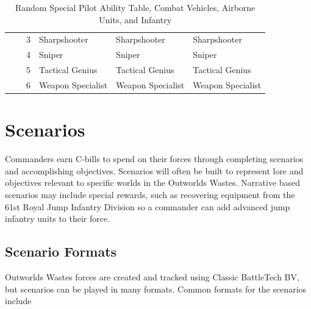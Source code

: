 \documentclass{article}
\begin{document}
\begin{itemize}
\begin{table}[!ht]
\begin{tabular}{| C{4em} | C{4em} | C{4em} | m{10em} | m{10em} | m{10em} |}
      &        & 3     & Sharpshooter      & Sharpshooter      & Sharpshooter      \\
      &        & 4     & Sniper            & Sniper            & Sniper            \\
      &        & 5     & Tactical Genius   & Tactical Genius   & Tactical Genius   \\
      &        & 6     & Weapon Specialist & Weapon Specialist & Weapon Specialist \\
\hline
\end{tabular}
\caption*{Random Special Pilot Ability Table, Combat Vehicles, Airborne Units, and Infantry}
\end{table}

\end{itemize}

\clearpage

\newpage

\section{Scenarios}

Commanders earn C-bills to spend on their forces through completing scenarios and accomplishing objectives.
Scenarios will often be built to represent lore and objectives relevant to specific worlds in the Outworlds Wastes.
Narrative based scenarios may include special rewards, such as recovering equipment from the 61st Royal Jump Infantry Division so a commander can add advanced jump infantry units to their force.

\subsection{Scenario Formats}

Outworlds Wastes forces are created and tracked using Classic BattleTech BV, but scenarios can be played in many formats.
Common formats for the scenarios include
\end{document}
